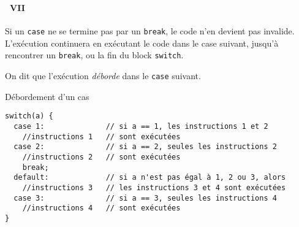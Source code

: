 \begin{frame}[containsverbatim]
  \frametitle{\secname}
  \framesubtitle{\subsecname~VII}

  Si un \verb|case| ne se termine pas par un \verb|break|, le code n'en devient pas invalide. L'exécution continuera en exécutant le code dans le case suivant, jusqu'à
  rencontrer un \verb|break|, ou la fin du block \verb|switch|.
  \vspace{0.3cm}
  \par
  On dit que l'exécution \textit{déborde} dans le \verb|case| suivant.
  {\footnotesize\begin{exampleblock}{Débordement d'un cas}
    \begin{verbatim}
switch(a) {
  case 1:              // si a == 1, les instructions 1 et 2 
    //instructions 1   // sont exécutées
  case 2:              // si a == 2, seules les instructions 2
    //instructions 2   // sont exécutées
    break;
  default:             // si a n'est pas égal à 1, 2 ou 3, alors
    //instructions 3   // les instructions 3 et 4 sont exécutées
  case 3:              // si a == 3, seules les instructions 4 
    //instructions 4   // sont exécutées
}\end{verbatim}  
  \end{exampleblock}}
\end{frame}

